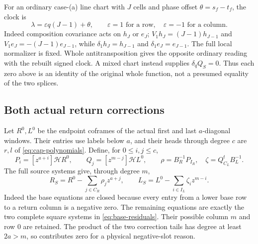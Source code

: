 \documentclass[11pt,a4paper]{amsart}
\numberwithin{equation}{section}
\theoremstyle{plain}
\theoremstyle{definition}
\newcommand{\eps}{\varepsilon}
\begin{document}
For an ordinary case-(a) line chart with \(J\) cells and phase offset
\(\theta=s_f-t_f\), the clock is
\[
 \lambda=\eps q(J-1)+\theta,
 \qquad \eps=1\text{ for a row},\quad
        \eps=-1\text{ for a column}.
\]
Indeed composition covariance \cite[Composition covariance]{Shields2026Readout} acts on \(h_J\) or \(e_J\);
\(V_1h_J=(J-1)h_{J-1}\) and
\(V_1e_J=-(J-1)e_{J-1}\), while
\(\delta_1h_J=h_{J-1}\) and \(\delta_1e_J=e_{J-1}\).
The full local normalizer is fixed.  Whole antitransposition gives the
opposite ordinary reading with the rebuilt signed clock.  A mixed chart
instead supplies \(\delta_qQ_S=0\).  Thus each zero above is an identity
of the original whole function, not a presumed equality of the two
splices.

\subsection{Both actual return corrections}
Let \(R^0,L^0\) be the endpoint coframes of the actual first and last \(a\)-diagonal windows.  Their entries use labels below \(a\), and their heads through degree \(c\) are \(r,l\) of \eqref{eq:cap-polynomials}.  Define, for \(0\le i,j\le c\),
\begin{equation}\label{eq:base-residuals}
 P_i=[z^{a+i}]\mathcal HR^0,\qquad Q_j=[z^{m-j}]\mathcal H L^0,
 \qquad \rho=B_R^{-1}P_{I_R},\quad \zeta=Q_{C_L}^{t}B_L^{-1}.
\end{equation}
The full source systems give, through degree \(m\),
\begin{equation}\label{eq:source-truncations}
 R_S=R^0-\sum_{j\in C_R}\rho_jz^{a+j},\qquad
 L_S=L^0-\sum_{i\in I_L}\zeta_i z^{m-i}.
\end{equation}
Indeed the base equations are closed because every entry from a lower base row to a return column is a negative zero.  The remaining equations are exactly the two complete square systems in \eqref{eq:base-residuals}.  Their possible column \(m\) and row \(0\) are retained.  The product of the two correction tails has degree at least \(2a>m\), so contributes zero for a physical negative-slot reason.
\end{document}
